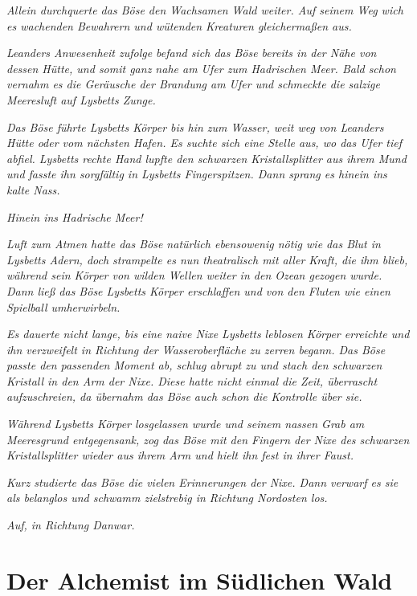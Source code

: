 \textit{Allein durchquerte das Böse den Wachsamen Wald weiter. Auf seinem Weg wich es wachenden Bewahrern und wütenden Kreaturen gleichermaßen aus.}

\textit{Leanders Anwesenheit zufolge befand sich das Böse bereits in der Nähe von dessen Hütte, und somit ganz nahe am Ufer zum Hadrischen Meer. Bald schon vernahm es die Geräusche der Brandung am Ufer und schmeckte die salzige Meeresluft auf Lysbetts Zunge.}

\textit{Das Böse führte Lysbetts Körper bis hin zum Wasser, weit weg von Leanders Hütte oder vom nächsten Hafen. Es suchte sich eine Stelle aus, wo das Ufer tief abfiel. Lysbetts rechte Hand lupfte den schwarzen Kristallsplitter aus ihrem Mund und fasste ihn sorgfältig in Lysbetts Fingerspitzen. Dann sprang es hinein ins kalte Nass.}

\textit{Hinein ins Hadrische Meer!}

\textit{Luft zum Atmen hatte das Böse natürlich ebensowenig nötig wie das Blut in Lysbetts Adern, doch strampelte es nun theatralisch mit aller Kraft, die ihm blieb, während sein Körper von wilden Wellen weiter in den Ozean gezogen wurde. Dann ließ das Böse Lysbetts Körper erschlaffen und von den Fluten wie einen Spielball umherwirbeln.}

\textit{Es dauerte nicht lange, bis eine naive Nixe Lysbetts leblosen Körper erreichte und ihn verzweifelt in Richtung der Wasseroberfläche zu zerren begann. Das Böse passte den passenden Moment ab, schlug abrupt zu und stach den schwarzen Kristall in den Arm der Nixe. Diese hatte nicht einmal die Zeit, überrascht aufzuschreien, da übernahm das Böse auch schon die Kontrolle über sie.}

\textit{Während Lysbetts Körper losgelassen wurde und seinem nassen Grab am Meeresgrund entgegensank, zog das Böse mit den Fingern der Nixe des schwarzen Kristallsplitter wieder aus ihrem Arm und hielt ihn fest in ihrer Faust.}

\textit{Kurz studierte das Böse die vielen Erinnerungen der Nixe. Dann verwarf es sie als belanglos und schwamm zielstrebig in Richtung Nordosten los.}

\textit{Auf, in Richtung Danwar.}
















\newpage
\section{Der Alchemist im Südlichen Wald}




